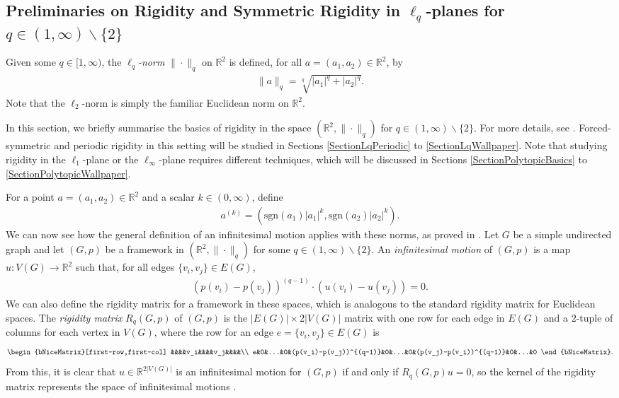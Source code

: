 \documentclass[reqno,a4paper,10pt]{article}
\theoremstyle{definition}
\theoremstyle{remark}
\numberwithin{equation}{section}
\numberwithin{figure}{section}
\numberwithin{table}{section}
\newcommand{\R}{\mathbb{R}}
\begin{document}
    \subsection{Preliminaries on Rigidity and Symmetric Rigidity in $\ell_q$-planes for $q\in(1,\infty)\backslash\{2\}$}\label{SectionLqBasics}
    Given some $q\in[1,\infty)$, the \emph{$\ell_q$-norm} $\|\cdot\|_q$ on $\R^2$ is defined, for all $a=(a_1,a_2)\in\R^2$, by
    \begin{align*}
        \|a\|_q=\sqrt[q]{|a_1|^q+|a_2|^q}.
    \end{align*}
    Note that the $\ell_2$-norm is simply the familiar Euclidean norm on $\R^2$.
    
    In this section, we briefly summarise the basics of rigidity in the space $(\R^2,\|\cdot\|_q)$ for $q\in(1,\infty)\backslash\{2\}$. For more details, see \cite{NonEuclidean}. Forced-symmetric and periodic rigidity in this setting will be studied in Sections \ref{SectionLqPeriodic} to \ref{SectionLqWallpaper}. Note that studying rigidity in the $\ell_1$-plane or the $\ell_\infty$-plane requires different techniques, which will be discussed in Sections \ref{SectionPolytopicBasics} to \ref{SectionPolytopicWallpaper}.
    
    For a point $a=(a_1,a_2)\in\R^2$ and a scalar $k\in(0,\infty)$, define
    \begin{align*}
        a^{(k)}=(\mathrm{sgn}(a_1)|a_1|^k,\mathrm{sgn}(a_2)|a_2|^k).
    \end{align*}
     We can now see how the general definition of an infinitesimal motion applies with these norms, as proved in \cite[Proposition 3.2]{NonEuclidean}. Let $G$ be a simple undirected graph and let $(G,p)$ be a framework in $(\R^2,\|\cdot\|_q)$ for some $q\in(1,\infty)\backslash\{2\}$. An \emph{infinitesimal motion} of $(G,p)$ is a map $u:V(G)\to\R^2$ such that, for all edges $\{v_i,v_j\}\in E(G)$,
    \begin{align*}
        (p(v_i)-p(v_j))^{(q-1)}\cdot(u(v_i)-u(v_j))=0.
    \end{align*}
    We can also define the rigidity matrix for a framework in these spaces, which is analogous to the standard rigidity matrix for Euclidean spaces. The \emph{rigidity matrix} $R_q(G,p)$ of $(G,p)$ is the $|E(G)|\times 2|V(G)|$ matrix with one row for each edge in $E(G)$ and a $2$-tuple of columns for each vertex in $V(G)$, where the row for an edge $e=\{v_i,v_j\}\in E(G)$ is
     \setcounter{MaxMatrixCols}{20}
		\begin{align*}
        \begin{bNiceMatrix}[first-row,first-col]
         &&&&v_i&&&&v_j&&&&\\
		  e&0&...&0&(p(v_i)-p(v_j))^{(q-1)}&0&...&0&(p(v_j)-p(v_i))^{(q-1)}&0&...&0
        \end{bNiceMatrix}
        .
    \end{align*}
    From this, it is clear that $u\in\R^{2|V(G)|}$ is an infinitesimal motion for $(G,p)$ if and only if $R_q(G,p)u=0$, so the kernel of the rigidity matrix represents the space of infinitesimal motions \cite[Proposition 3.2]{NonEuclidean}.
\end{document}
